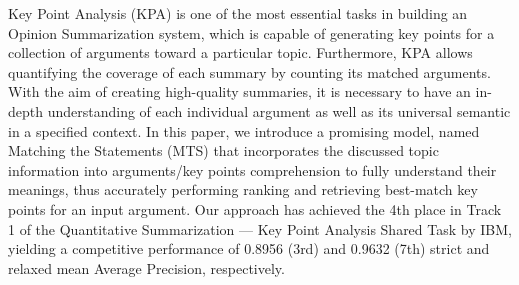 Key Point Analysis (KPA) is one of the most essential tasks in building an Opinion Summarization system, which is capable of generating key points for a collection of arguments toward a particular topic. Furthermore, KPA allows quantifying the coverage of each summary by counting its matched arguments. With the aim of creating high-quality summaries, it is necessary to have an in-depth understanding of each individual argument as well as its universal semantic in a specified context. In this paper, we introduce a promising model, named Matching the Statements (MTS) that incorporates the discussed topic information into arguments/key points comprehension to fully understand their meanings, thus accurately performing ranking and retrieving best-match key points for an input argument. Our approach  has achieved the 4th place in Track 1 of the Quantitative Summarization --- Key Point Analysis Shared Task by IBM, yielding a competitive performance of 0.8956 (3rd) and 0.9632 (7th) strict and relaxed mean Average Precision, respectively.
